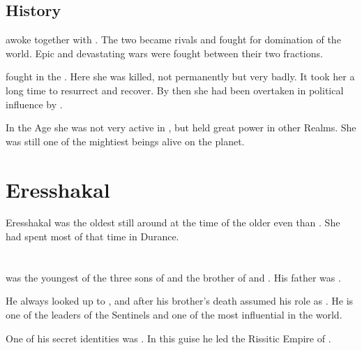 \subsection{History}
\Rephexsar awoke together with \Nexagglachel. 
The two became rivals and fought for domination of the world.
Epic and devastating wars were fought between their two fractions. 

\Rephexsar fought in the \secondbanewar. 
Here she was killed, not permanently but very badly. 
It took her a long time to resurrect and recover. 
By then she had been overtaken in political influence by \Secherdamon. 

In the \Scatha Age she was not very active in \Azmith, but held great power in other Realms.
She was still one of the mightiest beings alive on the planet. 















\section{Eresshakal}
Eresshakal was the oldest \dragon still around at the time of the \thirdbanewar\dash older even than \Iscrafel. 
She had spent most of that time in Durance.















\section{\IrocasSecherdamon}
\index{\Secherdamon}
\index{\IrocasSecherdamon}
\IrocasSecherdamon{} was the youngest of the three sons of {\Tiamat} and the brother of \Ishnaruchaefir and \Nexagglachel. 
His father was .

He always looked up to \Nexagglachel, and after his brother's death \Secherdamon{} assumed his role as \dragonking. He is one of the leaders of the Sentinels and one of the most influential \dragons{} in the world.

One of his secret identities was \HriistN. 
In this guise he led the Rissitic Empire of \Durcac. 


